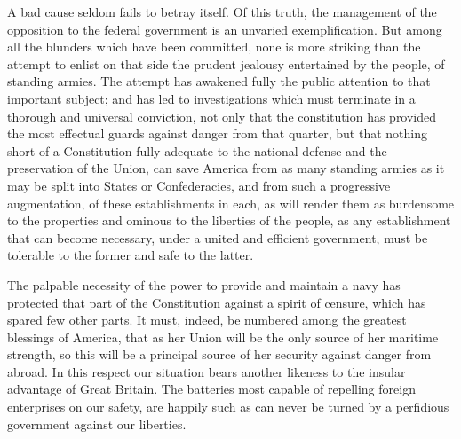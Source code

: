 A bad cause seldom fails to betray itself. Of this truth, the management of the opposition to the federal government is an unvaried exemplification. But among all the blunders which have been committed, none is more striking than the attempt to enlist on that side the prudent jealousy entertained by the people, of standing armies. The attempt has awakened fully the public attention to that important subject; and has led to investigations which must terminate in a thorough and universal conviction, not only that the constitution has provided the most effectual guards against danger from that quarter, but that nothing short of a Constitution fully adequate to the national defense and the preservation of the Union, can save America from as many standing armies as it may be split into States or Confederacies, and from such a progressive augmentation, of these establishments in each, as will render them as burdensome to the properties and ominous to the liberties of the people, as any establishment that can become necessary, under a united and efficient government, must be tolerable to the former and safe to the latter.

The palpable necessity of the power to provide and maintain a navy has protected that part of the Constitution against a spirit of censure, which has spared few other parts. It must, indeed, be numbered among the greatest blessings of America, that as her Union will be the only source of her maritime strength, so this will be a principal source of her security against danger from abroad. In this respect our situation bears another likeness to the insular advantage of Great Britain. The batteries most capable of repelling foreign enterprises on our safety, are happily such as can never be turned by a perfidious government against our liberties.


